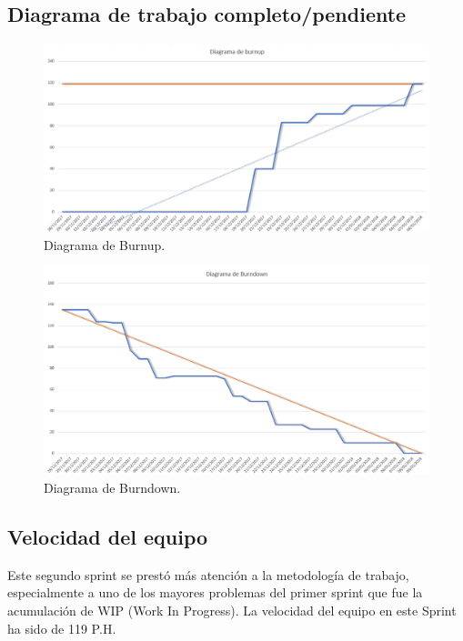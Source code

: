 \documentclass[11pt,a4paper]{report}
\begin{document}
\subsection{Diagrama de trabajo completo/pendiente}
\begin{figure}[H]
	
	\centering
	
	\includegraphics[width=1\textwidth]{graficos/burnup.png}
	
	\caption{Diagrama de Burnup.}
	
	\label{fig: burnup2}
	
\end{figure}
\begin{figure}[H]
	\centering
	\includegraphics[width=1\textwidth]{graficos/burndown.png}
	\caption{Diagrama de Burndown.}
	\label{fig: burndown2}
\end{figure}
\subsection{Velocidad del equipo}
Este segundo sprint se prestó más atención a la metodología de trabajo, especialmente a uno de los mayores problemas del primer sprint que fue la acumulación de WIP (Work In Progress). La velocidad del equipo en este Sprint ha sido de 119 P.H.
\end{document}
